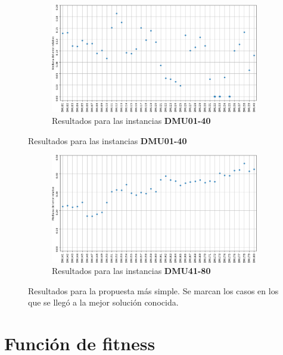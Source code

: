 \begin{figure}[H]
    \begin{subfigure}{\textwidth}
        \centering
        \includegraphics[scale=.65]{Imagenes/resn7ils1.png}
        \caption{Resultados para las instancias \textbf{DMU01-40}}
    \end{subfigure}
\end{figure}
\begin{figure}[H]\ContinuedFloat
    \begin{subfigure}{\textwidth}
        \centering
        \includegraphics[scale=.65]{Imagenes/resn7ils2.png}
        \caption{Resultados para las instancias \textbf{DMU41-80}}
    \end{subfigure}
    \caption{Resultados para la propuesta más simple. Se marcan los casos en los que se llegó a la mejor solución conocida.}
\end{figure}

\section{Función de fitness}


